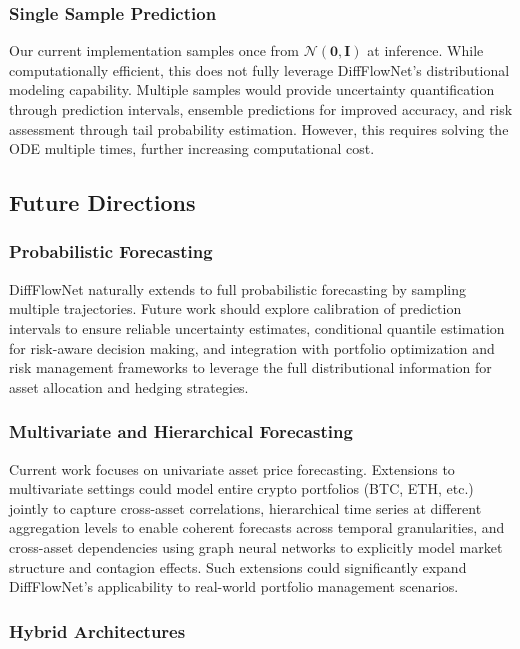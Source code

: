 \documentclass[11pt,a4paper]{article}
\begin{document}
\subsubsection{Single Sample Prediction}

Our current implementation samples once from $\mathcal{N}(\mathbf{0}, \mathbf{I})$ at inference. While computationally efficient, this does not fully leverage DiffFlowNet's distributional modeling capability. Multiple samples would provide uncertainty quantification through prediction intervals, ensemble predictions for improved accuracy, and risk assessment through tail probability estimation. However, this requires solving the ODE multiple times, further increasing computational cost.

\subsection{Future Directions}

\subsubsection{Probabilistic Forecasting}

DiffFlowNet naturally extends to full probabilistic forecasting by sampling multiple trajectories. Future work should explore calibration of prediction intervals to ensure reliable uncertainty estimates, conditional quantile estimation for risk-aware decision making, and integration with portfolio optimization and risk management frameworks to leverage the full distributional information for asset allocation and hedging strategies.

\subsubsection{Multivariate and Hierarchical Forecasting}

Current work focuses on univariate asset price forecasting. Extensions to multivariate settings could model entire crypto portfolios (BTC, ETH, etc.) jointly to capture cross-asset correlations, hierarchical time series at different aggregation levels to enable coherent forecasts across temporal granularities, and cross-asset dependencies using graph neural networks to explicitly model market structure and contagion effects. Such extensions could significantly expand DiffFlowNet's applicability to real-world portfolio management scenarios.

\subsubsection{Hybrid Architectures}
\end{document}
